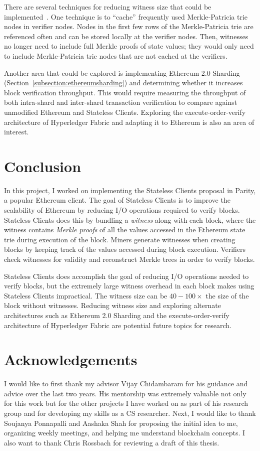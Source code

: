 \documentclass[12pt]{article}
\newcommand{\System}{Stateless Clients\xspace}
\begin{document}
There are several techniques for reducing witness size that could be implemented~\cite{ethereum-stateless-analysis}. One technique is to ``cache'' frequently used Merkle-Patricia trie nodes in verifier nodes. Nodes in the first few rows of the Merkle-Patricia trie are referenced often and can be stored locally at the verifier nodes. Then, witnesses no longer need to include full Merkle proofs of state values; they would only need to include Merkle-Patricia trie nodes that are not cached at the verifiers.

Another area that could be explored is implementing Ethereum 2.0 Sharding (Section~\ref{subsection:ethereumsharding}) and determining whether it increases block verification throughput. This would require measuring the throughput of both intra-shard and inter-shard transaction verification to compare against unmodified Ethereum and \System. Exploring the execute-order-verify architecture of Hyperledger Fabric and adapting it to Ethereum is also an area of interest.


\section{Conclusion}

In this project, I worked on implementing the \System proposal in Parity, a popular Ethereum client. The goal of \System is to improve the scalability of Ethereum by reducing I/O operations required to verify blocks. \System does this by bundling a \emph{witness} along with each block, where the witness contains \emph{Merkle proofs} of all the values accessed in the Ethereum state trie during execution of the block. Miners generate witnesses when creating blocks by keeping track of the values accessed during block execution. Verifiers check witnesses for validity and reconstruct Merkle trees in order to verify blocks.

\System does accomplish the goal of reducing I/O operations needed to verify blocks, but the extremely large witness overhead in each block makes using \System impractical. The witness size can be $40-100\times$ the size of the block without witnesses. Reducing witness size and exploring alternate architectures such as Ethereum 2.0 Sharding and the execute-order-verify architecture of Hyperledger Fabric are potential future topics for research.

\section{Acknowledgements}

I would like to first thank my advisor Vijay Chidambaram for his guidance and advice over the last two years. His mentorship was extremely valuable not only for this work but for the other projects I have worked on as part of his research group and for developing my skills as a CS researcher. Next, I would like to thank Soujanya Ponnapalli and Aashaka Shah for proposing the initial idea to me, organizing weekly meetings, and helping me understand blockchain concepts. I also want to thank Chris Rossbach for reviewing a draft of this thesis.




\end{document}
